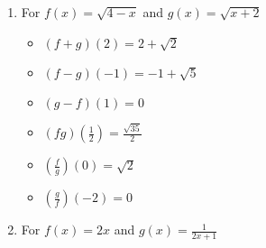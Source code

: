 \begin{enumerate}
\begin{multicols}{3}
\begin{itemize}

\item  $(f+g)(2) = 3+\sqrt{5}$
\item  $(f-g)(-1) = 3+\sqrt{2}$
\item  $(g-f)(1) = -1$

\end{itemize}
\end{multicols}

\begin{multicols}{3}
\begin{itemize}

\item  $(fg)\left(\frac{1}{2}\right) = 0$
\item  $\left(\frac{f}{g}\right)(0) = -\sqrt{3}$
\item  $\left(\frac{g}{f}\right)\left(-2\right) = -5$

\end{itemize}
\end{multicols}

\item For $f(x) = \sqrt{4-x}$ and $g(x) = \sqrt{x+2}$

\begin{multicols}{3}
\begin{itemize}

\item  $(f+g)(2) = 2+\sqrt{2}$
\item  $(f-g)(-1) = -1+\sqrt{5}$
\item  $(g-f)(1) = 0$

\end{itemize}
\end{multicols}

\begin{multicols}{3}
\begin{itemize}

\item  $(fg)\left(\frac{1}{2}\right) = \frac{\sqrt{35}}{2}$
\item  $\left(\frac{f}{g}\right)(0) = \sqrt{2}$
\item  $\left(\frac{g}{f}\right)\left(-2\right) = 0$

\end{itemize}
\end{multicols}

\newpage

\item For  $f(x) = 2x$ and  $g(x) = \frac{1}{2x+1}$


\end{enumerate}

